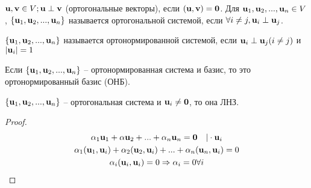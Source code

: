 \documentclass[main]{subfiles}
\begin{document}
\begin{definition}
    $\mathbf{u}, \mathbf{v} \in V; \mathbf{u} \perp \mathbf{v}$ (ортогональные векторы), если $(\mathbf{u},\mathbf{v})=\mathbf{0}$.
    Для $\mathbf{u}_1, \mathbf{u}_2, ..., \mathbf{u}_n \in V$, $\{\mathbf{u}_1, \mathbf{u}_2, ..., \mathbf{u}_n\}$
    называется ортогональной системой, если $\forall i\neq j, \mathbf{u}_i \perp \mathbf{u}_j$.
\end{definition}
\begin{definition}
    $\{\mathbf{u}_1, \mathbf{u}_2,..., \mathbf{u}_n\}$ называется ортонормированной системой, если
    $\mathbf{u}_i \perp \mathbf{u}_j (i \neq j)$ и $|\mathbf{u}_i| =1 $
\end{definition}
\begin{definition}
    Если $\{\mathbf{u}_1, \mathbf{u}_2,..., \mathbf{u}_n\}$ -- ортонормированная система и базис, то это
    ортонормированный базис (ОНБ).
\end{definition}
\begin{assertion}
    $\{\mathbf{u}_1, \mathbf{u}_2,..., \mathbf{u}_n\}$ -- ортогональная система и $\mathbf{u}_i \neq \mathbf{0}$, то она ЛНЗ.
\end{assertion}
\begin{proof}
    \begin{gather*}
        \alpha_1 \mathbf{u}_1 + \alpha \mathbf{u}_2 + ... + \alpha_n \mathbf{u}_n = \mathbf{0} \quad |\cdot \mathbf{u}_i\\
        \alpha_1 (\mathbf{u}_1, \mathbf{u}_i) + \alpha_2 (\mathbf{u}_2, \mathbf{u}_i) +  ... + \alpha_n(\mathbf{u}_n, \mathbf{u}_i) = 0\\
        \alpha_i (\mathbf{u}_i, \mathbf{u}_i) = 0 \Rightarrow \alpha_i = 0 \forall i
    \end{gather*}
\end{proof}
\end{document}
